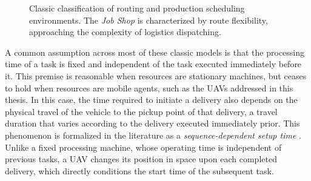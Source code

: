 \begin{figure}[htbp]
{%
    }
    \caption{Classic classification of routing and production scheduling environments. The \textit{Job Shop} is characterized by route flexibility, approaching the complexity of logistics dispatching.}
    \label{fig:scheduling_environments}
\end{figure}

A common assumption across most of these classic models is that the processing time of a task is fixed and independent of the task executed immediately before it. This premise is reasonable when resources are stationary machines, but ceases to hold when resources are mobile agents, such as the UAVs addressed in this thesis. In this case, the time required to initiate a delivery also depends on the physical travel of the vehicle to the pickup point of that delivery, a travel duration that varies according to the delivery executed immediately prior. This phenomenon is formalized in the literature as a \textit{sequence-dependent setup time} \cite{Allahverdi2015, Hosseini2024}. Unlike a fixed processing machine, whose operating time is independent of previous tasks, a UAV changes its position in space upon each completed delivery, which directly conditions the start time of the subsequent task.

